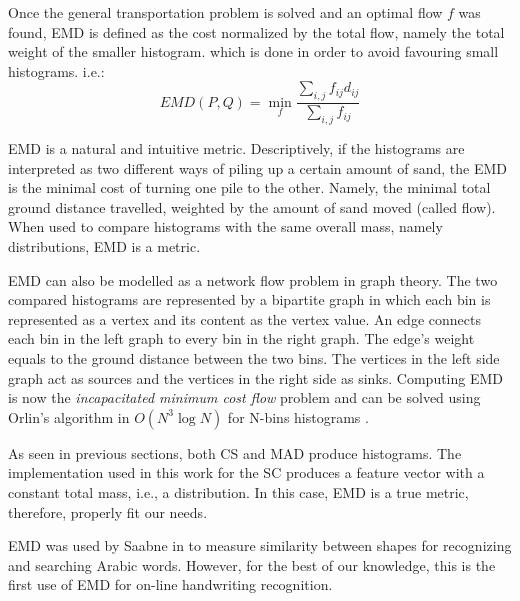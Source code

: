 \iftoggle{edit-mode}{\hspace{0pt}\marginpar{EMD definition}}{}
Once the general transportation problem is solved and an optimal flow $f$ was found, EMD is defined as the cost normalized by the total flow, namely the total weight of the smaller histogram. which is done in order to avoid favouring small histograms. i.e.:
\begin{equation}
EMD(P,Q)=\min\limits_{f} {\frac{\sum_{i,j} f_{ij}d_{ij}}{\sum_{i,j} f_{ij}}}
\end{equation}

EMD is a natural and intuitive metric.
Descriptively, if the histograms are interpreted as two different ways of piling up a certain amount of sand, the EMD is the minimal cost of turning one pile to the other.
Namely, the minimal total ground distance travelled, weighted by the amount of sand moved (called flow). 
When used to compare histograms with the same overall mass, namely distributions, EMD is a metric.

\iftoggle{edit-mode}{\hspace{0pt}\marginpar{EMD modeling as flow in graph}}{}
EMD can also be modelled as a network flow problem in graph theory. 
The two compared histograms are represented by a bipartite graph in which each bin is represented as a vertex and its content as the vertex value. 
An edge connects each bin in the left graph to every bin in the right graph. 
The edge's weight equals to the ground distance between the two bins. 
The vertices in the left side graph act as sources and the vertices in the right side as sinks. 
Computing EMD is now the \emph{incapacitated minimum cost flow} problem and can be solved using Orlin's algorithm in $O(N^3 \log N)$ for N-bins histograms \cite{shirdhonkar2008approximate}.

\iftoggle{edit-mode}{\hspace{0pt}\marginpar{EMD in Feature space}}{}
As seen in previous sections, both CS and MAD produce histograms. 
The implementation used in this work for the SC produces a feature vector with a constant total mass, i.e., a distribution. 
In this case, EMD is a true metric, therefore, properly fit our needs.

\iftoggle{edit-mode}{\hspace{0pt}\marginpar{EMD in handwriting recognition}}{}
EMD was used by Saabne in \cite{saabni2013efficient} to measure similarity between shapes for recognizing and searching Arabic words. 
However, for the best of our knowledge, this is the first use of EMD for on-line handwriting recognition.


